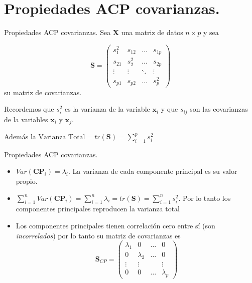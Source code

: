 \documentclass[
  ignorenonframetext,
]{beamer}
\providecommand{\tightlist}{%
  \setlength{\itemsep}{0pt}\setlength{\parskip}{0pt}}
\begin{document}
\hypertarget{propiedades-acp-covarianzas.}{%
\section{Propiedades ACP
covarianzas.}\label{propiedades-acp-covarianzas.}}

\begin{frame}{Propiedades ACP covarianzas.}
\protect\hypertarget{propiedades-acp-covarianzas.-1}{}
Sea \(\mathbf{X}\) una matriz de datos \(n\times p\) y sea

\[
\mathbf{S}=\begin{pmatrix}
s_1^2& s_{ 1 2}&\ldots &s_{1 p}\\
s_{2 1}& s_{2}^2&\ldots &s_{2 p}\\
\vdots & \vdots &\ddots & \vdots\\
s_{p 1}& s_{ p 2}&\ldots &s_{p}^2
\end{pmatrix}
\] su matriz de covarianzas.

Recordemos que \(s_i^2\) es la varianza de la variable \(\mathbf{x}_i\)
y que \(s_{i j}\) son las covarianzas de la variables \(\mathbf{x}_i\) y
\(\mathbf{x}_j\).

Además la \(\mbox{Varianza Total}= tr(\mathbf{S})=\sum_{i=1}^p s_i^2\)
\end{frame}

\begin{frame}{Propiedades ACP covarianzas.}
\protect\hypertarget{propiedades-acp-covarianzas.-2}{}
\begin{itemize}
\tightlist
\item
  \(Var(\mathbf{CP}_i)= \lambda_i\). La varianza de cada componente
  principal es su valor propio.
\item
  \(\sum_{i=1}^n Var(\mathbf{CP}_i)=\sum_{i=1}^n \lambda_i=tr(\mathbf{S})=\sum_{i=1}^n s_i^2\).
  Por lo tanto los componentes principales reproducen la varianza total
\item
  Los componentes principales tienen correlación cero entre sí (son
  \emph{incorrelados}) por lo tanto su matriz de covarianzas es
  \[\mathbf{S}_{CP}=\left(\begin{array}{cccc}
  \lambda_1& 0 &\ldots &0\\
  0& \lambda_{2}&\ldots & 0\\
  \vdots & \vdots & & \vdots\\
  0 & 0&\ldots &\lambda_{p}
  \end{array}
  \right)\]
\end{itemize}
\end{frame}
\end{document}
